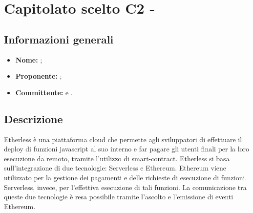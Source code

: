 \section{Capitolato scelto C2 - \NomeProgetto}

\subsection{Informazioni generali}
	\begin{itemize}
		\item \textbf{Nome:} \NomeProgetto{}; 
		\item \textbf{Proponente:} \Proponente;
		\item \textbf{Committente:} \TV{} e \RC{}. 
	\end{itemize}

\subsection{Descrizione}
Etherless è una piattaforma cloud che permette agli sviluppatori di effettuare il deploy di funzioni javascript al suo interno e far pagare gli utenti finali per la loro esecuzione da remoto, tramite l'utilizzo di smart-contract. Etherless si basa sull'integrazione di due tecnologie: Serverless e Ethereum. Ethereum viene utilizzato per la gestione dei pagamenti e delle richieste di esecuzione di funzioni. Serverless, invece, per l'effettiva esecuzione di tali funzioni. La comunicazione tra queste due tecnologie è resa possibile tramite l'ascolto e l'emissione di eventi Ethereum.

